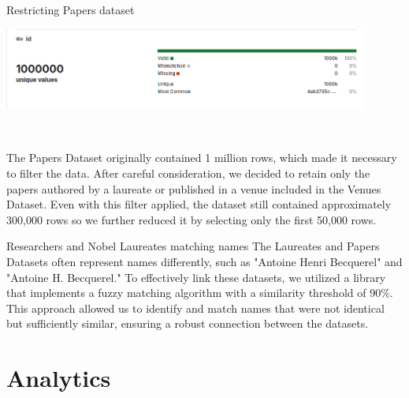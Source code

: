 \documentclass[aspectratio=169,xcolor=dvipsnames]{beamer}
\begin{document}
\begin{frame}{Restricting Papers dataset}
	\centering
	\begin{minipage}{0.8\textwidth}
		\centering
		\includegraphics[width=0.9\textwidth]{huge_dataset.png}
	\end{minipage} \\
	\vspace{1em}
	\begin{minipage}{0.8\textwidth}
		The Papers Dataset originally contained 1 million rows, which made it necessary to filter the data.
		After careful consideration, we decided to retain only the papers authored by a laureate or published
		in a venue included in the Venues Dataset.
		Even with this filter applied, the dataset still contained approximately 300,000 rows so we further
		reduced it by selecting only the first 50,000 rows.
	\end{minipage}
\end{frame}

\begin{frame}{Researchers and Nobel Laureates matching names}
	The Laureates and Papers Datasets often represent names differently, such as "Antoine Henri Becquerel"
	and "Antoine H. Becquerel." To effectively link these datasets, we utilized a library that implements a
	fuzzy matching algorithm with a similarity threshold of 90\%. This approach allowed us to identify and
	match names that were not identical but sufficiently similar, ensuring a robust connection between the
	datasets.
\end{frame}

\section{Analytics}
\end{document}
